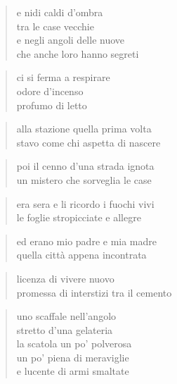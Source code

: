 \clearpage


\begin{verse}
    e nidi caldi d’ombra\\
    tra le case vecchie\\
    e negli angoli delle nuove\\
    che anche loro hanno segreti
\end{verse}

\begin{verse}
    ci si ferma a respirare\\
    odore d’incenso\\
    profumo di letto
\end{verse}

\clearpage


\begin{verse}
    alla stazione quella prima volta\\
    stavo come chi aspetta di nascere
\end{verse}

\begin{verse}
    poi il cenno d’una strada ignota\\
    un mistero che sorveglia le case
\end{verse}

\begin{verse}
    era sera e li ricordo i fuochi vivi\\
    le foglie stropicciate e allegre
\end{verse}

\begin{verse}
    ed erano mio padre e mia madre\\
    quella città appena incontrata
\end{verse}

\begin{verse}
    licenza di vivere nuovo\\
    promessa di interstizi tra il cemento
\end{verse}

\clearpage


\begin{verse}
    uno scaffale nell'angolo\\
    stretto d'una gelateria\\
    la scatola un po' polverosa\\
    un po' piena di meraviglie\\
    e lucente di armi smaltate
\end{verse}


